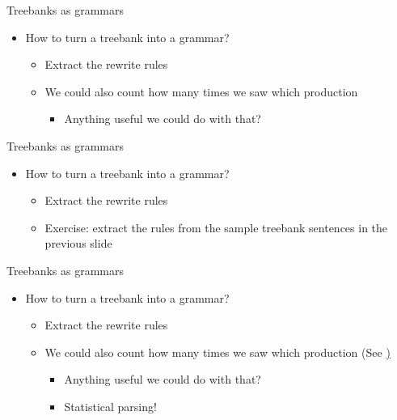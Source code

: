 \documentclass{beamer}
\begin{document}
\begin{frame}{Treebanks as grammars}
\begin{itemize}
\item How to turn a treebank into a grammar?
  \begin{itemize}
  \item Extract the rewrite rules
  \item We could also count how many times we saw which production
    \begin{itemize}
    \item Anything useful we could do with that?
    \end{itemize}
  \end{itemize}
\end{itemize}
\end{frame}

\begin{frame}{Treebanks as grammars}
  \begin{itemize}
  \item How to turn a treebank into a grammar?
    \begin{itemize}
    \item Extract the rewrite rules
    \item Exercise: extract the rules from the sample treebank sentences in the previous slide
    \end{itemize}
  \end{itemize}
\end{frame}


\begin{frame}{Treebanks as grammars}
\begin{itemize}
\item How to turn a treebank into a grammar?
  \begin{itemize}
  \item Extract the rewrite rules
  \item We could also count how many times we saw which production (See \href{https://youtu.be/HSAUqdDnYEU})
    \begin{itemize}
    \item Anything useful we could do with that?
    \item Statistical parsing! 
    \end{itemize}
  \end{itemize}
\end{itemize}
\end{frame}
\end{document}
